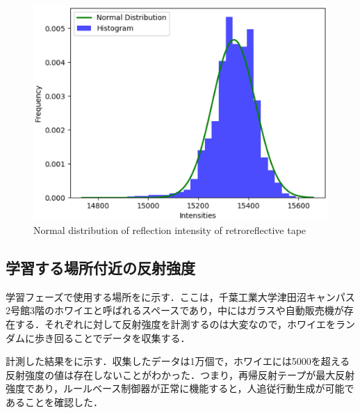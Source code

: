   \begin{figure}[h]
    \centering
    \includegraphics[keepaspectratio, scale=0.50] {images/eps/RobotGuidance_plot_reflection_intensities_of_tape}
    \captionsetup{justification=raggedright} %
    \caption{Normal distribution of reflection intensity of retroreflective tape}
    \label{Fig:Normal distribution of reflection intensity of retroreflective tape}
  \end{figure}

\newpage

\subsection{学習する場所付近の反射強度}

  学習フェーズで使用する場所をに示す．ここは，千葉工業大学津田沼キャンパス2号館3階のホワイエと呼ばれるスペースであり，中にはガラスや自動販売機が存在する．それぞれに対して反射強度を計測するのは大変なので，ホワイエをランダムに歩き回ることでデータを収集する．

  計測した結果をに示す．収集したデータは1万個で，ホワイエには5000を超える反射強度の値は存在しないことがわかった．つまり，再帰反射テープが最大反射強度であり，ルールベース制御器が正常に機能すると，人追従行動生成が可能であることを確認した．

